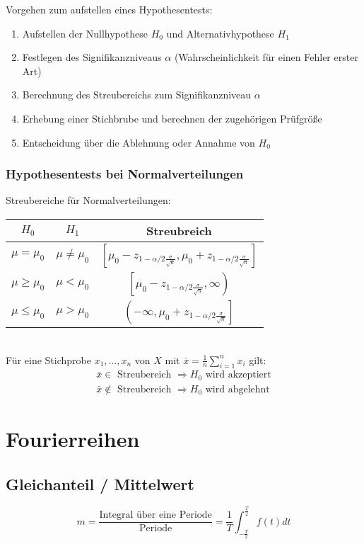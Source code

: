 \documentclass[12pt]{article}
\begin{document}
Vorgehen zum aufstellen eines Hypothesentests:
\begin{enumerate}
	\item Aufstellen der Nullhypothese $H_0$ und Alternativhypothese $H_1$
	\item Festlegen des Signifikanzniveaus $\alpha$ (Wahrscheinlichkeit für einen Fehler erster Art)
	\item Berechnung des Streubereichs zum Signifikanzniveau $\alpha$
	\item Erhebung einer Stichbrube und berechnen der zugehörigen Prüfgröße
	\item Entscheidung über die Ablehnung oder Annahme von $H_0$
\end{enumerate}
\subsubsection{Hypothesentests bei Normalverteilungen}
Streubereiche für Normalverteilungen:\\
\begin{tabular}{|c|c|c|}
	\hline
	\textbf{$H_0$} & \textbf{$H_1$} & \textbf{Streubreich}\\\hline
	$\mu=\mu_0$ & $\mu\neq\mu_0$ & $\left[\mu_0-z_{1-\alpha/2\frac{\sigma}{\sqrt{n}}}, \mu_0+z_{1-\alpha/2\frac{\sigma}{\sqrt{n}}}\right]$\\\hline
	$\mu\geq\mu_0$ & $\mu<\mu_0$ & $\left[\mu_0-z_{1-\alpha/2\frac{\sigma}{\sqrt{n}}}, \infty\right)$\\\hline
	$\mu\leq\mu_0$ & $\mu>\mu_0$ & $\left(-\infty, \mu_0+z_{1-\alpha/2\frac{\sigma}{\sqrt{n}}}\right]$\\\hline
\end{tabular}\\
Für eine Stichprobe $x_1,...,x_n$ von $X$ mit $\bar{x}=\frac{1}{n}\sum_{i=1}^nx_i$ gilt:
\begin{gather*}
	\bar{x}\in \text{ Streubereich }\Rightarrow H_0 \text{ wird akzeptiert}\\
	\bar{x}\notin \text{ Streubereich }\Rightarrow H_0 \text{ wird abgelehnt}
\end{gather*}
\section{Fourierreihen}
\subsection{Gleichanteil / Mittelwert}
\begin{equation*}
	m=\frac{\text{Integral über eine Periode}}{\text{Periode}}=\frac{1}{T}\int_{-\frac{T}{2}}^{\frac{T}{2}}f(t)dt
\end{equation*}
\end{document}
